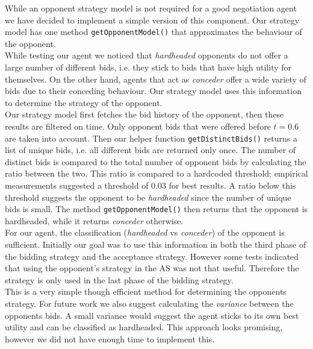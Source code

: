 
While an opponent strategy model is not required for a good negotiation agent we have decided to implement a simple version of this component. Our strategy model has one method \texttt{getOpponentModel()} that approximates the behaviour of the opponent. \\

While testing our agent we noticed that \emph{hardheaded} opponents do not offer a large number of different bids, i.e. they stick to bids that have high utility for themselves. On the other hand, agents that act as \emph{conceder} offer a wide variety of bids due to their conceding behaviour. Our strategy model uses this information to determine the strategy of the opponent. \\

Our strategy model first fetches the bid history of the opponent, then these results are filtered on time. Only opponent bids that were offered before $t=0.6$ are taken into account. Then our helper function \texttt{getDistinctBids()} returns a list of unique bids, i.e. all different bids are returned only once. The number of distinct bids is compared to the total number of opponent bids by calculating the ratio between the two. This ratio is compared to a hardcoded threshold; empirical measurements suggested a threshold of $0.03$ for best results. A ratio below this threshold suggests the opponent to be \emph{hardheaded} since the number of unique bids is small. The method \texttt{getOpponentModel()} then returns that the opponent is hardheaded, while it returns \emph{conceder} otherwise. \\

For our agent, the classification (\emph{hardheaded} vs \emph{conceder}) of the opponent is sufficient. Initially our goal was to use this information in both the third phase of the bidding strategy and the acceptance strategy. However some tests indicated that using the opponent's strategy in the AS was not that useful. Therefore the strategy is only used in the last phase of the bidding strategy. \\

This is a very simple though efficient method for determining the opponents strategy. For future work we also suggest calculating the \emph{variance} between the opponents bids. A small variance would suggest the agent sticks to its own best utility and can be classified as hardheaded. This approach looks promising, however we did not have enough time to implement this.
